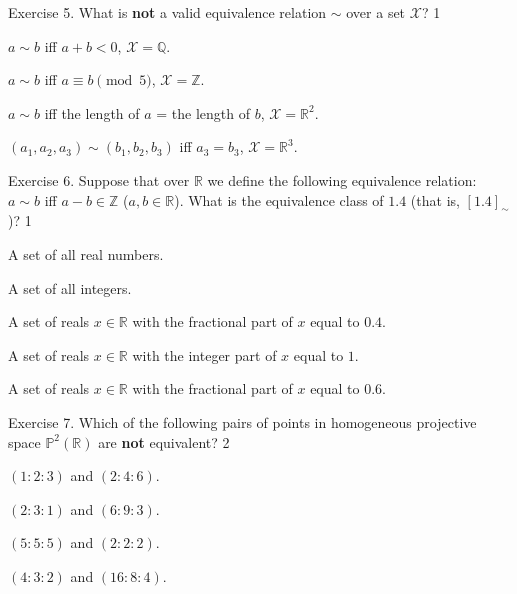 \documentclass[../../book.tex]{subfiles}
\begin{document}
\begin{xexercise}
    {Exercise 5.}
    {What is \textbf{not} a valid equivalence relation $\sim$ over a set $\mathcal{X}$?}
    {1}
    {
        \item $a \sim b$ iff $a+b < 0$, $\mathcal{X} = \mathbb{Q}$.
        \item $a\sim b$ iff $a \equiv b \pmod{5}$, $\mathcal{X} = \mathbb{Z}$.
        \item $a\sim b$ iff the length of $a$ = the length of $b$, $\mathcal{X} = \mathbb{R}^2$.
        \item $(a_1,a_2,a_3)\sim (b_1,b_2,b_3)$ iff $a_3=b_3$, $\mathcal{X} = \mathbb{R}^3$.
    }
\end{xexercise}

\begin{xexercise}
    {Exercise 6.}
    {Suppose that over $\mathbb{R}$ we define the following equivalence relation: $a \sim b$ iff $a-b \in \mathbb{Z}$ ($a,b \in \mathbb{R}$). What is the equivalence class of $1.4$ (that is, $[1.4]_{\sim}$)?}
    {1}
    {
        \item A set of all real numbers.
        \item A set of all integers.
        \item A set of reals $x \in \mathbb{R}$ with the fractional part of $x$ equal to $0.4$.
        \item A set of reals $x \in \mathbb{R}$ with the integer part of $x$ equal to $1$.
        \item A set of reals $x \in \mathbb{R}$ with the fractional part of $x$ equal to $0.6$.
    }
\end{xexercise}

\begin{xexercise}
    {Exercise 7.}
    {Which of the following pairs of points in homogeneous projective space $\mathbb{P}^2(\mathbb{R})$ are \textbf{not} equivalent?}
    {2}
    {
        \item $(1:2:3)$ and $(2:4:6)$.
        \item $(2:3:1)$ and $(6:9:3)$.
        \item $(5:5:5)$ and $(2:2:2)$.
        \item $(4:3:2)$ and $(16:8:4)$.
    }
\end{xexercise}
\end{document}
